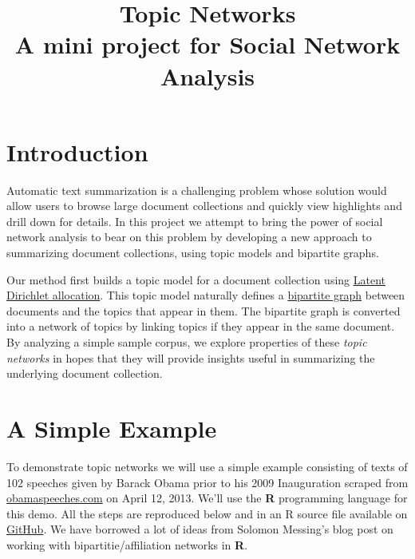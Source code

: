 \documentclass[%
	final,
	notitlepage,
	narroweqnarray,
	inline,
	]{ieee}
\begin{document}
\nocite{big}
\nocite{Sh:1}
\nocite{small} 

\title[Topic Networks]{
       Topic Networks \\
       {\Large A mini project for Social Network Analysis}
}



\maketitle               
\section{Introduction}

\PARstart Automatic text summarization is a challenging problem whose solution 
would allow users to browse large document collections and quickly view highlights 
and drill down for details.  
In this project we attempt to bring the power of social network analysis to bear on
this problem by developing 
a new approach to summarizing document collections, using topic models and bipartite 
graphs. 

Our method first builds a topic model for a document collection using 
\href{http://en.wikipedia.org/wiki/Latent_Dirichlet_allocation}{Latent Dirichlet allocation}\cite{lda}.
This topic model naturally defines a \href{http://en.wikipedia.org/wiki/Bipartite_graph}{bipartite graph}\cite{bipartite} 
between documents and the topics that appear in 
them.  The bipartite graph is converted into a network of topics by linking
topics if they appear in the same document.  By analyzing a simple sample corpus, we explore 
properties of these {\em topic networks} in hopes that they will
provide insights useful in summarizing the
underlying document collection.


\section{A Simple Example}

\PARstart To demonstrate topic networks we will use a simple example consisting of
texts of 102 speeches given by Barack Obama prior to his 2009 Inauguration scraped from 
\href{http://obamaspeeches.com/}{obamaspeeches.com}\cite{speeches} on April 12, 2013.
We'll use the {\bf R} programming language\cite{cran} for this demo. All the steps
are reproduced below and in an R source file available on
\href{https://github.com/bobflagg/Topic-Networks}{GitHub}\cite{github}. We have
borrowed a lot of ideas from Solomon Messing's blog post\cite{messing} on 
working with bipartitie/affiliation networks in {\bf R}.
\end{document}

